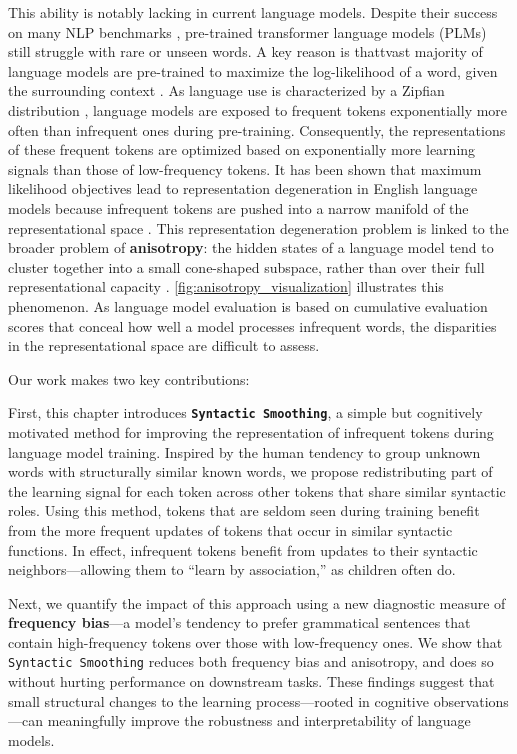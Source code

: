 This ability is notably lacking in current language models. Despite their success on many NLP benchmarks \citep{touvron2023llama, chowdhery2023palm}, pre-trained transformer language models (PLMs) still struggle with rare or unseen words. A key reason is thattvast majority of language models are pre-trained to maximize the log-likelihood of a word, given the surrounding context \citep{devlin2019bert, brown2020gpt3, chowdhery2023palm, touvron2023llama}. As language use is characterized by a Zipfian distribution \citep{zipf1935zipflaw}, language models are exposed to frequent tokens exponentially more often than infrequent ones during pre-training. Consequently, the representations of these frequent tokens are optimized based on exponentially more learning signals than those of low-frequency tokens. It has been shown that maximum likelihood objectives lead to representation degeneration in English language models because infrequent tokens are pushed into a narrow manifold of the representational space \citep{gao2018representation}. This representation degeneration problem is linked to the broader problem of \textbf{anisotropy}: the hidden states of a language model tend to cluster together into a small cone-shaped subspace, rather than over their full representational capacity \citep{arora2016latent, ethayarajh2019contextual, gao2018representation}. \cref{fig:anisotropy_visualization} illustrates this phenomenon. As language model evaluation is based on cumulative evaluation scores that conceal how well a model processes infrequent words, the disparities in the representational space are difficult to assess. 

Our work makes two key contributions:

First, this chapter introduces \textbf{\texttt{Syntactic Smoothing}}, a simple but cognitively motivated method for improving the representation of infrequent tokens during language model training. Inspired by the human tendency to group unknown words with structurally similar known words, we propose redistributing part of the learning signal for each token across other tokens that share similar syntactic roles. Using this method, tokens that are seldom seen during training benefit from the more frequent updates of tokens that occur in similar syntactic functions.  In effect, infrequent tokens benefit from updates to their syntactic neighbors—allowing them to ``learn by association,'' as children often do.

Next, we quantify the impact of this approach using a new diagnostic measure of \textbf{frequency bias}—a model's tendency to prefer grammatical sentences that contain high-frequency tokens over those with low-frequency ones. We show that \texttt{Syntactic Smoothing} reduces both frequency bias and anisotropy, and does so without hurting performance on downstream tasks. These findings suggest that small structural changes to the learning process—rooted in cognitive observations—can meaningfully improve the robustness and interpretability of language models.

